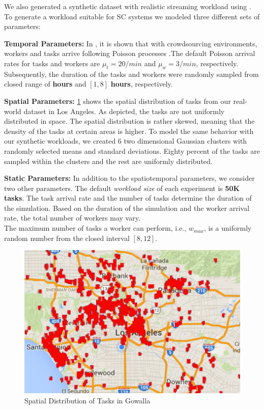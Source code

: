 We also generated a synthetic dataset with realistic streaming workload using \cite{To15}. To generate a workload suitable for SC systems we modeled three different sets of parameters:

\noindent \textbf{Temporal Parameters:} In \cite{Basu15}, it is shown that with crowdsourcing environments, workers and tasks arrive following Poisson processes \cite{Stoyan87}.The default Poisson arrival rates for tasks and workers are \boldmath$\mu_t = 20/min$ and $\mu_w = 3/min$, respectively. Subsequently, the duration of the tasks and workers were randomly sampled from closed range of \boldmath{$\left[1,4 \right]$} \textbf{hours} and $\left[1,8 \right]$ \textbf{hours}, respectively.

\noindent \textbf{Spatial Parameters:} \cref{fig:la_gowalla} shows the spatial distribution of tasks from our real-world dataset in Los Angeles. As depicted, the tasks are not uniformly distributed in space. The spatial distribution is rather skewed, meaning that the density of the tasks at certain areas is higher. To model the same behavior with our synthetic workloads, we created 6 two dimensional Gaussian clusters with randomly selected means and standard deviations. Eighty percent of the tasks are sampled within the clusters and the rest are uniformly distributed.

\noindent \textbf{Static Parameters:} In addition to the spatiotemporal parameters, we consider two other parameters. The default \emph{workload size} of each experiment is \textbf{50K tasks}. The task arrival rate and the number of tasks determine the duration of the simulation. Based on the duration of the simulation and the worker arrival rate, the total number of workers may vary.\\
The maximum number of tasks a worker can perform, i.e., $w_{max}$, is a uniformly random number from the closed interval \boldmath$\left[8,12 \right]$.

\begin{figure}[h]
	\centering
	\includegraphics[scale=0.35]{figures/la_flickr.jpg}
	\caption{Spatial Distribution of Tasks in Gowalla}\label{fig:la_gowalla}
\end{figure}

